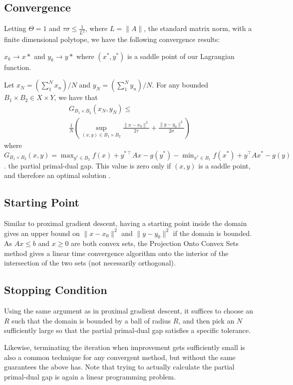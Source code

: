 \documentclass[letterpaper,twocolumn,12pt]{article}
\begin{document}
\subsection{Convergence}
Letting $\Theta=1$ and $\tau\sigma\leq\frac{1}{L^2}$, where $L=\|A\|$, the standard
matrix norm, with a finite dimensional polytope, we have the following convergence
results:

$x_k\rightarrow x*$ and $y_k\rightarrow y*$ where  $(x^*,y^*)$ is a saddle point of
our Lagrangian function.

Let $x_N=(\sum_1^N x_n)/N$ and $y_N=(\sum_1^N y_n)/N$. For any bounded
$B_1\times B_2\in X\times Y$, we have that
\begin{align*}
G_{B_1\times B_2}(x_N, y_N)\leq \\
\frac{1}{N}(\sup_{(x,y)\in B_1\times B_2}\frac{\|x-x_0\|^2}{2\tau}+\frac{\|y-y_0\|^2}{2\sigma})
\end{align*}
where $G_{B_1\times B_2}(x, y)=\max_{y^*\in B_2} f(x)+y^{*\intercal} Ax-g(y^*)-\min_{x^*\in B_1}f(x^*)+y^\intercal Ax^*-g(y)$.
the partial primal-dual gap. This value is zero only if $(x,y)$ is a saddle point,
and therefore an optimal solution \cite{Chambolle2010}.

\subsection{Starting Point}
Similar to proximal gradient descent, having a starting point inside the domain gives
an upper bound on $\|x-x_0\|^2$ and $\|y-y_0\|^2$ if the domain is bounded. As
$Ax\leq b$ and $x\geq 0$ are both convex sets, the Projection Onto Convex Sets method
gives a linear time convergence algorithm onto the interior of the intersection of
the two sets (not necessarily orthogonal)\cite{Gubin}.

\subsection{Stopping Condition}
Using the same argument as in proximal gradient descent, it suffices to choose an
$R$ such that the domain is bounded by a ball of radius $R$, and then pick an $N$
sufficiently large so that the partial primal-dual gap satisfies a specific tolerance.

Likewise, terminating the iteration when improvement gets sufficiently small is also
a common technique for any convergent method, but without the same guarantees the above
has. Note that trying to actually calculate the partial primal-dual gap is again
a linear programming problem.
\end{document}
